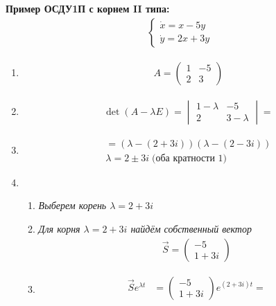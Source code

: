 \documentclass[10pt, a4paper]{article}
\begin{document}
\textbf{Пример ОСДУ1П с корнем II типа:}
\begin{gather*}
    \begin{cases}
        \dot{x} = x - 5y \\
        \dot{y} = 2x + 3y
    \end{cases}
\end{gather*}
\begin{enumerate}
    \item
        \begin{gather*}
            A =
            \begin{pmatrix}
                1 & -5 \\
                2 & 3
            \end{pmatrix}
        \end{gather*}
    \item
        \begin{gather*}
            \det{(A - \lambda E)} =
                \begin{vmatrix}
                    1 - \lambda & -5 \\
                    2           & 3 - \lambda
                \end{vmatrix} =
        \end{gather*}
    \item
        \begin{gather*}
            = (\lambda - (2 + 3i))(\lambda - (2 - 3i)) \\
            \lambda = 2 \pm 3i \; \text{(оба кратности 1)}
        \end{gather*}
    \item
        \begin{enumerate}
            \item \textit{Выберем корень $\lambda = 2 + 3i$}
            \item \textit{Для корня $\lambda = 2 + 3i$ найдём собственный вектор}
                \begin{gather*}
                    \Vec{S} =
                        \begin{pmatrix}
                            -5 \\
                            1 + 3i
                        \end{pmatrix}
                \end{gather*}
            \item
                \begin{align*}
                    \Vec{S} e^{\lambda t}
                    & = \begin{pmatrix} -5 \\ 1 + 3i \end{pmatrix} e^{(2 + 3i)t} = \\

\end{align*}
\end{enumerate}
\end{enumerate}
\end{document}
